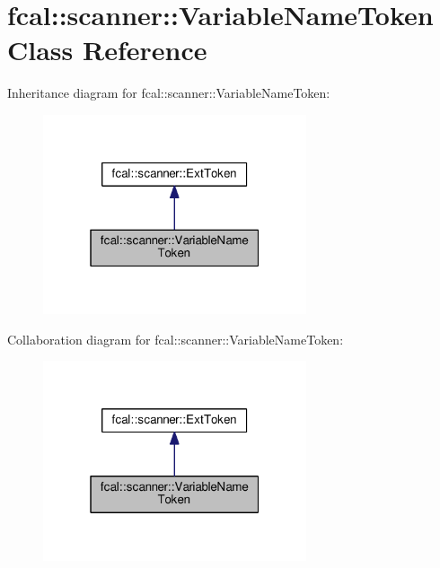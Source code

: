 \hypertarget{classfcal_1_1scanner_1_1VariableNameToken}{}\section{fcal\+:\+:scanner\+:\+:Variable\+Name\+Token Class Reference}
\label{classfcal_1_1scanner_1_1VariableNameToken}


Inheritance diagram for fcal\+:\+:scanner\+:\+:Variable\+Name\+Token\+:\nopagebreak
\begin{figure}[H]
\begin{center}
\leavevmode
\includegraphics[width=220pt]{classfcal_1_1scanner_1_1VariableNameToken__inherit__graph}
\end{center}
\end{figure}


Collaboration diagram for fcal\+:\+:scanner\+:\+:Variable\+Name\+Token\+:\nopagebreak
\begin{figure}[H]
\begin{center}
\leavevmode
\includegraphics[width=220pt]{classfcal_1_1scanner_1_1VariableNameToken__coll__graph}
\end{center}
\end{figure}
